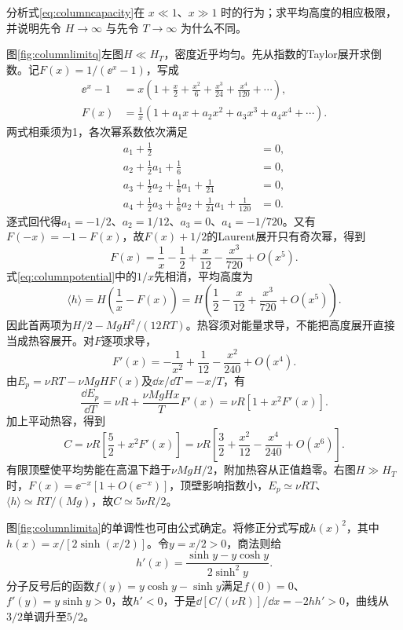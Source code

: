 \begin{example}[气柱热容的两端极限]\label{ex:columnlimits}
分析式\eqref{eq:columncapacity}在 $x\ll1$、$x\gg1$ 时的行为；求平均高度的相应极限，并说明先令 $H\to\infty$ 与先令 $T\to\infty$ 为什么不同。
\end{example}
\begin{solution}
图\ref{fig:columnlimitq}左图$H\ll H_T$，密度近乎均匀。先从指数的Taylor展开求倒数。记$F(x)=1/(\ee^x-1)$，写成
\[
 \begin{aligned}
 \ee^x-1&=x\left(1+\frac x2+\frac{x^2}6+\frac{x^3}{24}
 +\frac{x^4}{120}+\cdots\right),\\
 F(x)&=\frac1x(1+a_1x+a_2x^2+a_3x^3+a_4x^4+\cdots).
 \end{aligned}
\]
两式相乘须为1，各次幂系数依次满足
\[
 \begin{aligned}
 a_1+\tfrac12&=0,\\
 a_2+\tfrac12a_1+\tfrac16&=0,\\
 a_3+\tfrac12a_2+\tfrac16a_1+\tfrac1{24}&=0,\\
 a_4+\tfrac12a_3+\tfrac16a_2+\tfrac1{24}a_1+\tfrac1{120}&=0.
 \end{aligned}
\]
逐式回代得$a_1=-1/2$、$a_2=1/12$、$a_3=0$、$a_4=-1/720$。又有$F(-x)=-1-F(x)$，故$F(x)+1/2$的Laurent展开只有奇次幂，得到
\[
 F(x)=\frac1x-\frac12+\frac x{12}-\frac{x^3}{720}+O(x^5).
\]
式\eqref{eq:columnpotential}中的$1/x$先相消，平均高度为
\[
 \langle h\rangle=H\left(\frac1x-F(x)\right)
 =H\left(\frac12-\frac x{12}+\frac{x^3}{720}+O(x^5)\right).
\]
因此首两项为$H/2-MgH^2/(12RT)$。热容须对能量求导，不能把高度展开直接当成热容展开。对$F$逐项求导，
\[
 F'(x)=-\frac1{x^2}+\frac1{12}-\frac{x^2}{240}+O(x^4).
\]
由$E_p=\nu RT-\nu MgHF(x)$及$\dd x/\dd T=-x/T$，有
\[
 \frac{\dd E_p}{\dd T}=\nu R+\frac{\nu MgHx}{T}F'(x)
 =\nu R[1+x^2F'(x)].
\]
加上平动热容，得到
\[
 C=\nu R\left[\frac52+x^2F'(x)\right]
 =\nu R\left[\frac32+\frac{x^2}{12}-\frac{x^4}{240}+O(x^6)\right].
\]
有限顶壁使平均势能在高温下趋于$\nu MgH/2$，附加热容从正值趋零。右图$H\gg H_T$时，$F(x)=\ee^{-x}[1+O(\ee^{-x})]$，顶壁影响指数小，$E_p\simeq\nu RT$、$\langle h\rangle\simeq RT/(Mg)$，故$C\simeq5\nu R/2$。

图\ref{fig:columnlimita}的单调性也可由公式确定。将修正分式写成$h(x)^2$，其中$h(x)=x/[2\sinh(x/2)]$。令$y=x/2>0$，商法则给
\[
 h'(x)=\frac{\sinh y-y\cosh y}{2\sinh^2y}.
\]
分子反号后的函数$f(y)=y\cosh y-\sinh y$满足$f(0)=0$、$f'(y)=y\sinh y>0$，故$h'<0$，于是$\dd[C/(\nu R)]/\dd x=-2hh'>0$，曲线从$3/2$单调升至$5/2$。


\end{solution}
